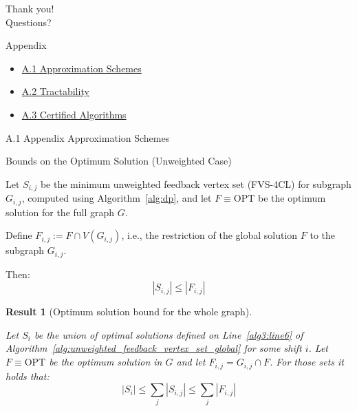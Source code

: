 \documentclass{beamer}
\newtheorem{result}{Result}
\newcommand{\backupbegin}{}
\begin{document}
\begin{frame}
  \centering
  \Huge Thank you!\\
  \vspace{0.5cm}
  \Large Questions?
\end{frame}

\appendix
\backupbegin

\begin{frame}
  \centering
  {\Huge Appendix}

  \vspace{2em}

  \Large
  \begin{itemize}
      \item \hyperlink{appendix-a1}{A.1 Approximation Schemes}
      \item \hyperlink{appendix-a2}{A.2 Tractability}
      \item \hyperlink{appendix-a3}{A.3 Certified Algorithms}
  \end{itemize}
\end{frame}

\begin{frame}{A.1}
  \hypertarget{appendix-a1}{}
  \centering
  \Huge Appendix Approximation Schemes
\end{frame}

\begin{frame}{Bounds on the Optimum Solution (Unweighted Case)}
    \footnotesize
    \begin{lemma}
    \label{lemma:opt-unweighted-fvs-4cl}

    Let \( S_{i,j} \) be the minimum unweighted feedback vertex set (FVS-4CL)
    for subgraph \( G_{i,j} \), computed using 
    Algorithm~\ref{alg:dp}, and let 
    \( F \equiv \text{OPT} \) be the optimum solution for the full graph \( G \).

    Define \( F_{i,j} := F \cap V(G_{i,j}) \), i.e., the restriction of the global solution \( F \) to the subgraph \( G_{i,j} \).

    Then:
    \[
    |S_{i,j}| \leq |F_{i,j}|
    \]
    \end{lemma}

    \begin{result}[Optimum solution bound for the whole graph]
    \label{result-two}

    Let \( S_i \) be the union of optimal solutions defined on Line~\ref{alg3:line6} of Algorithm~\ref{alg:unweighted_feedback_vertex_set_global} 
    for some shift \( i \). 
    Let \( F \equiv \text{OPT} \) be the optimum solution in \( G \) and let \( F_{i,j} = G_{i,j} \cap F \).
    For those sets it holds that:
    \[
    |S_i| \leq \sum_j |S_{i,j}| \leq \sum_j |F_{i,j}|
    \]
    \end{result}

\end{frame}
\end{document}
